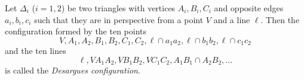 Let $\Delta_i$ ($i=1,2$) be two triangles with vertices $A_i, B_i, C_i$ and opposite edges $a_i, b_i, c_i$ such that they are in perspective from a point $V$ and a line $\ell$. Then the configuration formed by the ten points
$$V, A_1, A_2, B_1, B_2, C_1, C_2, \ell \cap a_1a_2, \ell \cap b_1b_2, \ell \cap c_1c_2$$
and the ten lines
$$\ell, VA_1A_2, VB_1B_2, VC_1C_2, A_1B_1 \cap A_2B_2, \dots$$
is called the \emph{Desargues configuration}.
